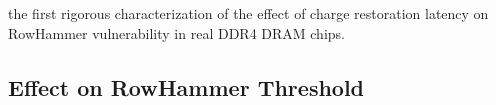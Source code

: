 



\section{}
\label{sec:rh_cr}
 the first rigorous characterization of the effect of charge restoration latency on RowHammer vulnerability in real DDR4 DRAM chips.
\subsection{Effect on RowHammer Threshold}
\label{sec:effect_nrh}

